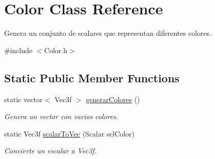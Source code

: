 \hypertarget{classColor}{}\section{Color Class Reference}
\label{classColor}


Genera un conjunto de scalares que representan diferentes colores.  




{\ttfamily \#include $<$Color.\+h$>$}

\subsection*{Static Public Member Functions}
\begin{DoxyCompactItemize}
\item 
static vector$<$ Vec3f $>$ \mbox{\hyperlink{classColor_a036f1d514a7bf1e6c36eb4231f18d43e}{generar\+Colores}} ()
\begin{DoxyCompactList}\small\item\em Genera un vector con varios colores. \end{DoxyCompactList}\item 
static Vec3f \mbox{\hyperlink{classColor_ae8b98ec693bfc1fde81e24f8e68a4b48}{scalar\+To\+Vec}} (Scalar scl\+Color)
\begin{DoxyCompactList}\small\item\em Convierte un escalar a Vec3f. \end{DoxyCompactList}\end{DoxyCompactItemize}

